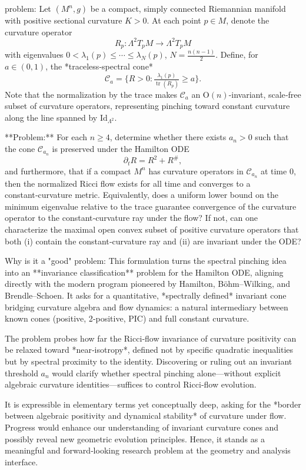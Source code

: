 problem:  
Let \( (M^n,g) \) be a compact, simply connected Riemannian manifold with positive sectional curvature \(K>0\).  
At each point \(p\in M\), denote the curvature operator  
\[
R_p:\Lambda^2T_pM\to\Lambda^2T_pM
\]
with eigenvalues \(0<\lambda_1(p)\le\cdots\le\lambda_N(p)\), \(N=\tfrac{n(n-1)}{2}\).  
Define, for \(a\in(0,1)\), the *traceless‑spectral cone*
\[
\mathcal{C}_a=\{R>0: \tfrac{\lambda_1(p)}{\operatorname{tr}(R_p)}\ge a\}.
\]
Note that the normalization by the trace makes \(\mathcal{C}_a\) an \(\mathrm{O}(n)\)-invariant, scale‑free subset of curvature operators, representing pinching toward constant curvature along the line spanned by \(\mathrm{Id}_{\Lambda^2}\).

**Problem:**  
For each \(n\ge4\), determine whether there exists \(a_n>0\) such that the cone \(\mathcal{C}_{a_n}\) is preserved under the Hamilton ODE  
\[
\partial_tR = R^2+R^\#,
\]
and furthermore, that if a compact \(M^n\) has curvature operators in \(\mathcal{C}_{a_n}\) at time \(0\), then the normalized Ricci flow exists for all time and converges to a constant‑curvature metric.  
Equivalently, does a uniform lower bound on the minimum eigenvalue relative to the trace guarantee convergence of the curvature operator to the constant‑curvature ray under the flow?  
If not, can one characterize the maximal open convex subset of positive curvature operators that both (i) contain the constant‑curvature ray and (ii) are invariant under the ODE?

Why is it a "good" problem:  
This formulation turns the spectral pinching idea into an **invariance classification** problem for the Hamilton ODE, aligning directly with the modern program pioneered by Hamilton, Böhm–Wilking, and Brendle–Schoen. It asks for a quantitative, *spectrally defined* invariant cone bridging curvature algebra and flow dynamics: a natural intermediary between known cones (positive, 2‑positive, PIC) and full constant curvature.  

The problem probes how far the Ricci‑flow invariance of curvature positivity can be relaxed toward *near‑isotropy*, defined not by specific quadratic inequalities but by spectral proximity to the identity. Discovering or ruling out an invariant threshold \(a_n\) would clarify whether spectral pinching alone—without explicit algebraic curvature identities—suffices to control Ricci‑flow evolution.  

It is expressible in elementary terms yet conceptually deep, asking for the *border between algebraic positivity and dynamical stability* of curvature under flow. Progress would enhance our understanding of invariant curvature cones and possibly reveal new geometric evolution principles. Hence, it stands as a meaningful and forward‑looking research problem at the geometry and analysis interface.